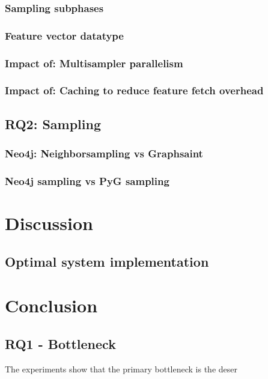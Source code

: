 \documentclass[ oneside,openright,titlepage,numbers=noenddot,headinclude,%
                footinclude=true,cleardoublepage=empty,abstractoff, %
                BCOR=0mm,paper=a4,fontsize=11pt,%
                ngerman,american,%
                ]{scrreprt}
\begin{document}
\subsection{Sampling subphases}
\subsection{Feature vector datatype}
\subsection{Impact of: Multisampler parallelism}
\subsection{Impact of: Caching to reduce feature fetch overhead}

\section{RQ2: Sampling}
\subsection{Neo4j: Neighborsampling vs Graphsaint}
\subsection{Neo4j sampling vs PyG sampling}



\chapter{Discussion}
\section{Optimal system implementation}

\chapter{Conclusion}

\section{RQ1 - Bottleneck}
The experiments show that the primary bottleneck is the deser
\end{document}
